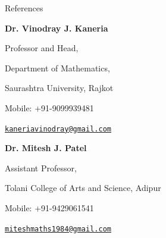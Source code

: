 \begin{rubric}{References}

\entry*[]%
\begin{minipage}[t]{0.48\textwidth}
\textbf{Dr. Vinodray J. Kaneria}\par
Professor and Head,\par
Department of Mathematics,\par
Saurashtra University, Rajkot\par
Mobile: +91-9099939481\par
\href{mailto:kaneriavinodray@gmail.com}{\texttt{kaneriavinodray@gmail.com}}
\end{minipage}
\hfill
\begin{minipage}[t]{0.48\textwidth}
\textbf{Dr. Mitesh J. Patel}\par
Assistant Professor,\par
Tolani College of Arts and Science, Adipur\par
Mobile: +91-9429061541\par
\href{mailto:miteshmaths1984@gmail.com}{\texttt{miteshmaths1984@gmail.com}}
\end{minipage}

\end{rubric}
